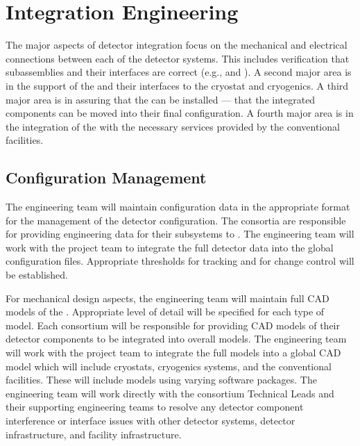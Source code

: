 \section{Integration Engineering}
\label{sec:fdsp-coord-integ-sysengr}

The major aspects of detector integration focus on the mechanical and
electrical connections between each of the detector systems. This
includes verification that subassemblies and their interfaces are
correct (e.g.,  and \single {}). A second major area is in the support of
the %
 and their interfaces to the cryostat and cryogenics. A
third major area is in assuring that the  %
can be installed ---
that the integrated components can be moved into their final
configuration. A fourth major area is in the integration of the %
 with the necessary services provided by the conventional
facilities.

\subsection{Configuration Management}
\label{sec:fdsp-coord-integ-config}

The  engineering team will maintain
configuration data in the appropriate format for the management of the
detector configuration. The consortia are responsible for providing
engineering data for their subsystems to . The
 engineering team will work with the  project team to
integrate the full detector data into the global 
configuration files. Appropriate thresholds for tracking and for
change control will be established.

For mechanical design aspects, the  engineering team
will maintain full \threed CAD models of the . Appropriate level
of detail will be specified for each type of model. Each consortium
will be responsible for providing CAD models of their detector
components to be integrated into overall models. The  engineering
team will work with the  project team to integrate the
full  models into a global  CAD model which will
include cryostats, cryogenics systems, and the conventional
facilities. These will include models using varying software
packages. The  engineering team will work directly with the
consortium Technical Leads and their supporting engineering teams to
resolve any detector component interference or interface issues with
other detector systems, detector infrastructure, and facility
infrastructure.


